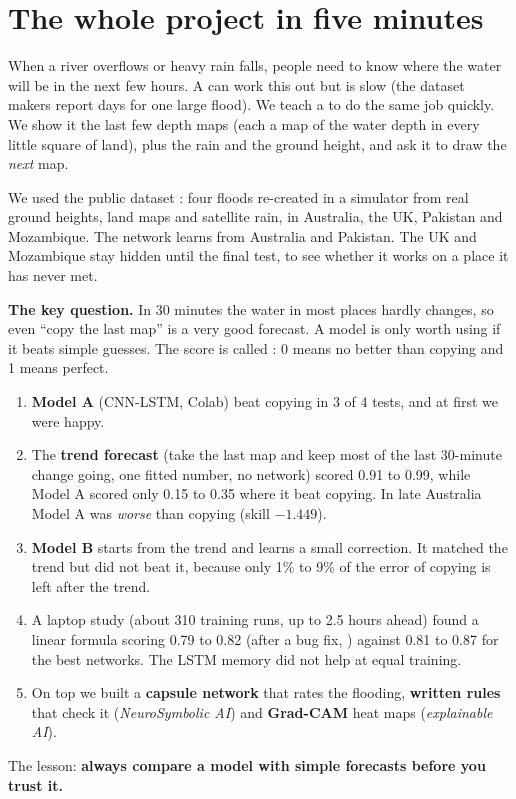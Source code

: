 \section{The whole project in five minutes}\label{ch:whole}

When a river overflows or heavy rain falls, people need to know where the water will be in the next few hours. A  can work this out but is slow (the dataset makers report days for one large flood). We teach a  to do the same job quickly. We show it the last few depth maps (each a map of the water depth in every little square of land), plus the rain and the ground height, and ask it to draw the \emph{next} map.

We used the public dataset : four floods re-created in a simulator from real ground heights, land maps and satellite rain, in Australia, the UK, Pakistan and Mozambique. The network learns from Australia and Pakistan. The UK and Mozambique stay hidden until the final test, to see whether it works on a place it has never met.

\textbf{The key question.} In 30 minutes the water in most places hardly changes, so even ``copy the last map'' is a very good forecast. A model is only worth using if it beats simple guesses. The score is called : 0 means no better than copying and 1 means perfect.

\begin{enumerate}
\item \textbf{Model A} (CNN-LSTM, Colab) beat copying in 3 of 4 tests, and at first we were happy.
\item The \textbf{trend forecast} (take the last map and keep most of the last 30-minute change going, one fitted number, no network) scored 0.91 to 0.99, while Model A scored only 0.15 to 0.35 where it beat copying. In late Australia Model A was \emph{worse} than copying (skill $-1.449$).
\item \textbf{Model B} starts from the trend and learns a small correction. It matched the trend but did not beat it, because only 1\% to 9\% of the error of copying is left after the trend.
\item A laptop study (about 310 training runs, up to 2.5 hours ahead) found a linear formula scoring 0.79 to 0.82 (after a bug fix, ) against 0.81 to 0.87 for the best networks. The LSTM memory did not help at equal training.
\item On top we built a \textbf{capsule network} that rates the flooding, \textbf{written rules} that check it (\emph{NeuroSymbolic AI}) and \textbf{Grad-CAM} heat maps (\emph{explainable AI}).
\end{enumerate}
The lesson: \textbf{always compare a model with simple forecasts before you trust it.}


